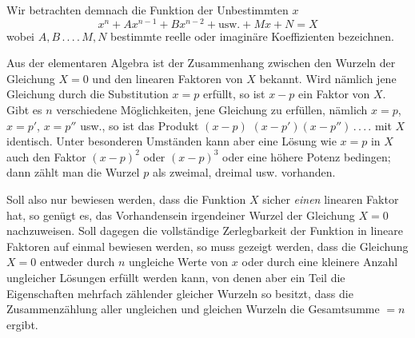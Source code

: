 Wir betrachten demnach die Funktion der Unbestimmten $x$
\[
x^n+Ax^{n-1}+Bx^{n-2}+\mathrm{usw.}+Mx+N=X
\]
wobei $A,B\,.\,.\,.\,.\,M,N$ bestimmte reelle oder imaginäre Koeffizienten bezeichnen.
\par
{}
Aus der elementaren Algebra ist der Zusammenhang zwischen den Wurzeln der Gleichung $X=0$ und den linearen Faktoren von $X$ bekannt. Wird nämlich jene Gleichung durch die Substitution $x=p$ erfüllt, so ist $x-p$ ein Faktor von $X$. Gibt es $n$ verschiedene Möglichkeiten, jene Gleichung zu erfüllen, nämlich $x=p$, $x=p'$, $x=p''$ usw., so ist das Produkt $(x-p)$ $(x-p')(x-p'')\, .\, .\, .\, .$ mit $X$ identisch. Unter besonderen Umständen kann aber eine Lösung wie $x=p$ in $X$ auch den Faktor $(x-p)^2$ oder $(x-p)^3$ oder eine höhere Potenz bedingen; dann zählt man die Wurzel $p$ als zweimal, dreimal usw. vorhanden.

Soll also nur bewiesen werden, dass die Funktion $X$ sicher \textit{einen} linearen Faktor hat, so genügt es, das Vorhandensein irgendeiner Wurzel der Gleichung $X=0$ nachzuweisen. Soll dagegen die vollständige Zerlegbarkeit der Funktion in lineare Faktoren auf einmal bewiesen werden, so muss gezeigt werden, dass die Gleichung $X=0$ entweder durch $n$ ungleiche Werte von $x$ oder durch eine kleinere Anzahl ungleicher Lösungen erfüllt werden kann, von denen aber ein Teil die Eigenschaften mehrfach zählender gleicher Wurzeln so besitzt, dass die Zusammenzählung aller ungleichen und gleichen Wurzeln die Gesamtsumme $=n$ ergibt.

